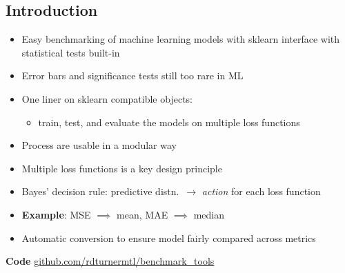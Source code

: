 \documentclass[a0,landscape]{a0poster}
\newcommand{\mysection}[1]{\section*{\fontsize{67.1}{82} \selectfont \color{NavyBlue} #1 \color{Black}}}
\begin{document}
\begin{multicols}{3} %


\Large

\mysection{Introduction}

\begin{itemize}
  \item Easy benchmarking of machine learning models with sklearn interface with statistical tests built-in
  \item Error bars and significance tests still too rare in ML
  \item One liner on sklearn compatible objects: 
  \begin{itemize}
    \item train, test, and evaluate the models on multiple loss functions
  \end{itemize}
  \item Process are usable in a modular way
\end{itemize}

\begin{itemize}
  \item Multiple loss functions is a key design principle
  \item Bayes' decision rule: predictive distn.~$\rightarrow$ \emph{action} for each loss function
  \item \textbf{Example}: MSE $\implies$ mean, MAE $\implies$ median
  \item Automatic conversion to ensure model fairly compared across metrics
\end{itemize}
%
\textbf{Code}
\large {\url{github.com/rdturnermtl/benchmark_tools}}

\columnbreak


\end{multicols}
\end{document}
